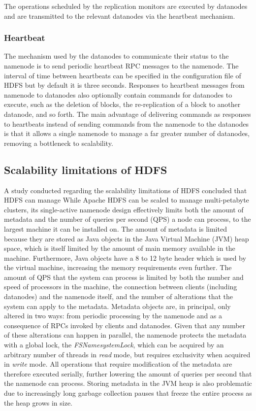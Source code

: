 The operations scheduled by the replication monitors are executed by datanodes and are transmitted to the relevant datanodes via the heartbeat mechanism.

\subsubsection{Heartbeat}
\label{sec:heartbeat}
The mechanism used by the datanodes to communicate their status to the namenode is to send periodic heartbeat RPC messages to the namenode.
The interval of time between heartbeats can be specified in the configuration file of HDFS but by default it is three seconds.
Responses to heartbeat messages from namenode to datanodes also optionally contain commands for datanodes to execute, such as the deletion of blocks, the re-replication of a block to another datanode, and so forth.
The main advantage of delivering commands as responses to heartbeats instead of sending commands from the namenode to the datanodes is that it allows a single namenode to manage a far greater number of datanodes, removing a bottleneck to scalability.

\subsection{Scalability limitations of HDFS}
\label{sec:scalability-limitations}
A study conducted regarding the scalability limitations of HDFS \cite{shvachko2010hdfs} concluded that HDFS can manage 
While Apache HDFS can be scaled to manage multi-petabyte clusters, its single-active namenode design effectively limits both the amount of metadata and the number of queries per second (QPS) a node can process, to the largest machine it can be installed on.
The amount of metadata is limited because they are stored as Java objects in the Java Virtual Machine (JVM) heap space, which is itself limited by the amount of main memory available in the machine.
Furthermore, Java objects have a 8 to 12 byte header which is used by the virtual machine, increasing the memory requirements even further.
The amount of QPS that the system can process is limited by both the number and speed of processors in the machine, the connection between clients (including datanodes) and the namenode itself, and the number of alterations that the system can apply to the metadata.
Metadata objects are, in principal, only altered in two ways: from periodic processing by the namenode and as a consequence of RPCs invoked by clients and datanodes.
Given that any number of these alterations can happen in parallel, the namenode protects the metadata with a global lock, the \textit{FSNamesystemLock}, which can be acquired by an arbitrary number of threads in \emph{read} mode, but requires exclusivity when acquired in \emph{write} mode.
All operations that require modification of the metadata are therefore executed serially, further lowering the amount of queries per second that the namenode can process.
Storing metadata in the JVM heap is also problematic due to increasingly long garbage collection pauses that freeze the entire process as the heap grows in size.


